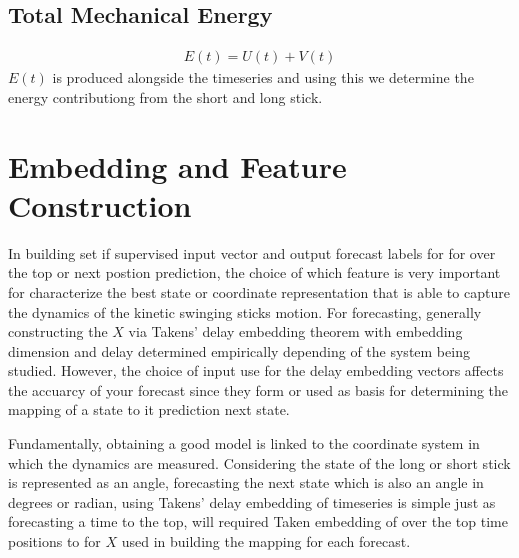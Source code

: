 \documentclass[letterpaper, 10pt, conference]{IEEEtran}
\begin{document}
            \subsection{\textbf{Total Mechanical Energy}}
                \begin{align}
                    E(t) = U(t) + V(t)
                \end{align}
                 $E(t)$ is produced alongside the timeseries and using this we determine the energy contributiong from the short and long stick.
                
                
                            


        \newpage
       
        \section{Embedding and Feature Construction}
            In building set if supervised input vector and output forecast labels  for for over the top or next postion prediction, the choice of which feature is very important for characterize the best state or coordinate representation that is able to capture the dynamics of the kinetic swinging sticks motion. For forecasting, generally constructing the $X$ via Takens'
            delay embedding theorem with embedding dimension and delay determined empirically depending of the system being studied. However, the choice of input use for the delay embedding vectors affects the accuarcy of your forecast since they form or used as basis for determining the mapping of a state to it prediction next state.
            
            Fundamentally, obtaining a good model is linked to the coordinate system in which the dynamics are measured. Considering the state of the long or short stick is represented as an angle, forecasting the next state which is also an angle in degrees or radian, using Takens' delay embedding of timeseries is simple just as forecasting a time to the top, will required Taken embedding of over the top time positions to for $X$ used in building the mapping for each forecast.
\end{document}
